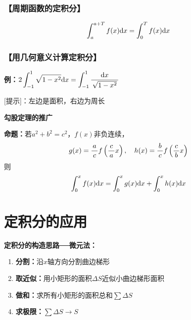 \subsubsection{【周期函数的定积分】}

$$\displaystyle\int_a^{a+T}f(x)\mathrm{d} x=\displaystyle\int_0^{T}f(x)\mathrm{d} x$$

\subsubsection{【用几何意义计算定积分】}

{\bf 例：}$2\displaystyle\int_{-1}^1\sqrt{1-x^2}\mathrm{d} x=
\displaystyle\int_{-1}^1\displaystyle\frac{\,{\mathrm{d} x}\,}{\,{\sqrt{1-x^2}}\,}$

[提示]：左边是面积，右边为周长

\begin{shaded}
	{\bf 勾股定理的推广}
	
	{\bf 命题：}若$a^2+b^2=c^2$，$f(x)$非负连续，
	$$g(x)=\displaystyle\frac{\,{a}\,}{\,{c}\,}f\left(\displaystyle\frac{\,{c}\,}{\,{a}\,}x\right),\quad 
	h(x)=\displaystyle\frac{\,{b}\,}{\,{c}\,}f\left(\displaystyle\frac{\,{c}\,}{\,{b}\,}x\right)$$
	则
	$$\displaystyle\int_0^xf(x)\mathrm{d} x=\displaystyle\int_0^xg(x)\mathrm{d} x+\displaystyle\int_0^xh(x)\mathrm{d} x$$
	\begin{center}
	\end{center}
\end{shaded}

\section{定积分的应用}

{\bf 定积分的构造思路──微元法：}

\begin{enumerate}
  \item {\bf 分割：}沿$x$轴方向分割曲边梯形 
  \item {\bf 取近似：}用小矩形的面积$\Delta S$近似小曲边梯形面积 
  \item {\bf 做和：}求所有小矩形的面积总和$\sum \Delta S$ 
  \item {\bf 求极限：}$\sum \Delta S\to S$
\end{enumerate}

